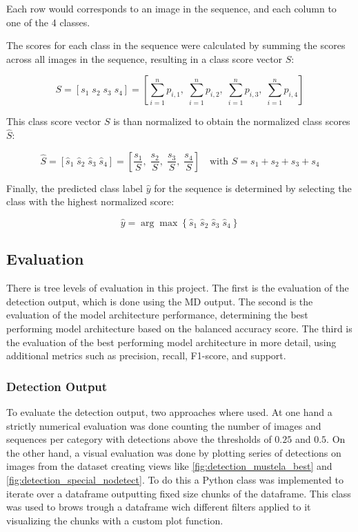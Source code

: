     Each row would corresponds to an image in the sequence, and each column to one of the 4 classes.

    The scores for each class in the sequence were calculated by summing the scores across all images in the sequence, resulting in a class score vector \( S \):

    \begin{equation}
    S = [s_1\; s_2\; s_3\; s_4] = \left[ \sum_{i=1}^n p_{i,1},\; \sum_{i=1}^n p_{i,2},\; \sum_{i=1}^n p_{i,3},\; \sum_{i=1}^n p_{i,4} \right]
    \label{eq:class_score_vector}
    \end{equation}

    This class score vector \( S \) is than normalized to obtain the normalized class scores \( \hat{S} \):

    \begin{equation}
    \hat{S} = [\hat{s}_1\; \hat{s}_2\; \hat{s}_3\; \hat{s}_4] = \left[ \frac{s_1}{S},\; \frac{s_2}{S},\; \frac{s_3}{S},\; \frac{s_4}{S} \right]
    \quad \text{with } S = s_1 + s_2 + s_3 + s_4
    \label{eq:normalized_class_scores}
    \end{equation}


    Finally, the predicted class label \( \hat{y} \) for the sequence is determined by selecting the class with the highest normalized score:

    \begin{equation}
    \hat{y} = \arg\max \left\{\hat{s}_1\; \hat{s}_2\; \hat{s}_3\; \hat{s}_4\right\}
    \label{eq:predicted_sequence_label}
    \end{equation}

    \subsection{Evaluation}
    There is tree levels of evaluation in this project.
    The first is the evaluation of the detection output, which is done using the \ac{MD} output.
    The second is the evaluation of the model architecture performance, determining the best performing model architecture based on the balanced accuracy score.
    The third is the evaluation of the best performing model architecture in more detail, using additional metrics such as precision, recall, F1-score, and support.

    \subsubsection{Detection Output}
    To evaluate the detection output, two approaches where used.
    At one hand a strictly numerical evaluation was done counting the number of images and sequences per category with detections above the thresholds of \(0.25\) and \(0.5\).
    On the other hand, a visual evaluation was done by plotting series of detections on images from the dataset creating views like \autoref{fig:detection_mustela_best} and \autoref{fig:detection_special_nodetect}.
    To do this a Python class was implemented to iterate over a dataframe outputting fixed size chunks of the dataframe.
    This class was used to brows trough a dataframe wich different filters applied to it visualizing the chunks with a custom plot function.

